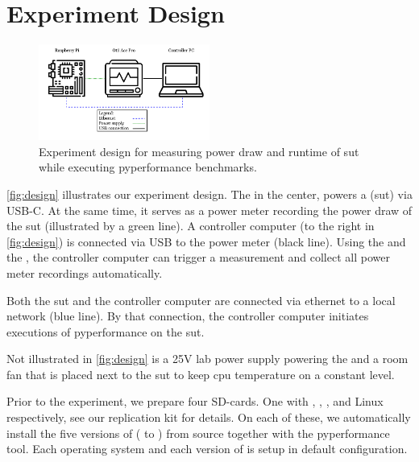 \section{Experiment Design}\label{sec:experimentdesign}

\begin{figure}
    \centering
    \includegraphics[width=0.5\textwidth]{images/experiment.png}
    \caption{Experiment design for measuring power draw and runtime of \gls{sut} while executing \gls{pyperformance} benchmarks.}
    \label{fig:design}
\end{figure}

\autoref{fig:design} illustrates our experiment design.
The  in the center, powers a  (\gls{sut}) via USB-C.
At the same time, it serves as a power meter recording the power draw of the \gls{sut} (illustrated by a green line).
A controller computer (to the right in \autoref{fig:design}) is connected via USB to the power meter (black line).
Using the 
and the 
, the controller computer can trigger a measurement and collect all power meter recordings automatically.

Both the \gls{sut} and the controller computer are connected via ethernet to a local network (blue line).
By that connection, the controller computer initiates executions of \acrlong{pyperformance} on the \gls{sut}.

Not illustrated in \autoref{fig:design} is a 25V lab power supply powering the  and a room fan that is placed next to the \gls{sut} to keep \gls{cpu} temperature on a constant level.

Prior to the experiment, we prepare four SD-cards.
One with , , , and  Linux respectively, see our replication kit for details.
On each of these, we automatically install the five versions of \python ( to ) from source together with the \gls{pyperformance} tool.
Each operating system and each version of \python is setup in default configuration.



